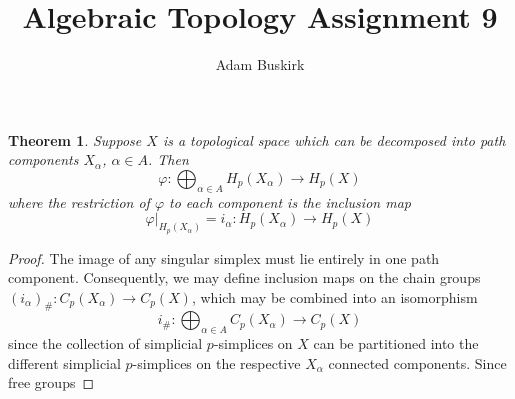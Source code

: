 \documentclass{article}
\title{Algebraic Topology Assignment 9}
\author{Adam Buskirk}
\newtheorem{theorem}{Theorem}
\theoremstyle{definition}
\begin{document}
\maketitle

\begin{theorem}
Suppose $X$ is a topological space which can be decomposed into
path components
$X_\alpha$, $\alpha \in A$. Then 
\[ \varphi : \bigoplus_{\alpha \in A} H_p (X_\alpha) \to H_p (X) \]
where the restriction of $\varphi$ to each component is the inclusion map
\[ \varphi|_{H_p(X_\alpha)} = i_\alpha : H_p(X_\alpha) \to H_p(X) \]
\end{theorem}
\begin{proof}
The image of any singular simplex must lie entirely in one path component.
Consequently, we may define inclusion maps on the chain groups 
$(i_\alpha)_\# : C_p(X_\alpha) \to C_p(X)$, which may be combined into an
isomorphism
\[
i_\# : \bigoplus_{\alpha \in A} C_p (X_\alpha) \to C_p (X)
\]
since the collection of simplicial $p$-simplices on $X$ can be partitioned
into the different simplicial $p$-simplices on the respective $X_\alpha$
connected components. Since free groups 
\end{proof}
\end{document}
